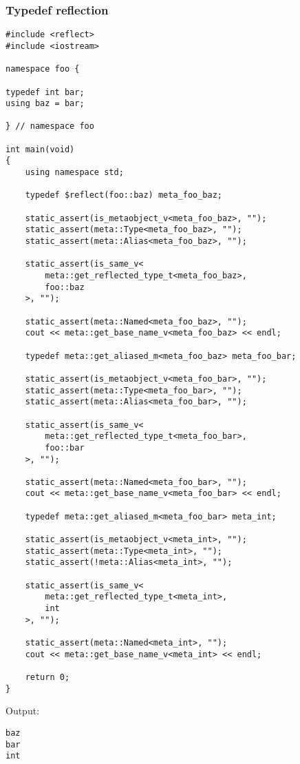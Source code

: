 \subsubsection{Typedef reflection}

\begin{verbatim}
#include <reflect>
#include <iostream>

namespace foo {

typedef int bar;
using baz = bar;

} // namespace foo

int main(void)
{
	using namespace std;

	typedef $reflect(foo::baz) meta_foo_baz;

	static_assert(is_metaobject_v<meta_foo_baz>, "");
	static_assert(meta::Type<meta_foo_baz>, "");
	static_assert(meta::Alias<meta_foo_baz>, "");

	static_assert(is_same_v<
		meta::get_reflected_type_t<meta_foo_baz>,
		foo::baz
	>, "");

	static_assert(meta::Named<meta_foo_baz>, "");
	cout << meta::get_base_name_v<meta_foo_baz> << endl;

	typedef meta::get_aliased_m<meta_foo_baz> meta_foo_bar;

	static_assert(is_metaobject_v<meta_foo_bar>, "");
	static_assert(meta::Type<meta_foo_bar>, "");
	static_assert(meta::Alias<meta_foo_bar>, "");

	static_assert(is_same_v<
		meta::get_reflected_type_t<meta_foo_bar>,
		foo::bar
	>, "");

	static_assert(meta::Named<meta_foo_bar>, "");
	cout << meta::get_base_name_v<meta_foo_bar> << endl;

	typedef meta::get_aliased_m<meta_foo_bar> meta_int;

	static_assert(is_metaobject_v<meta_int>, "");
	static_assert(meta::Type<meta_int>, "");
	static_assert(!meta::Alias<meta_int>, "");

	static_assert(is_same_v<
		meta::get_reflected_type_t<meta_int>,
		int
	>, "");

	static_assert(meta::Named<meta_int>, "");
	cout << meta::get_base_name_v<meta_int> << endl;

	return 0;
}

\end{verbatim}

Output:

\begin{verbatim}
baz
bar
int
\end{verbatim}

